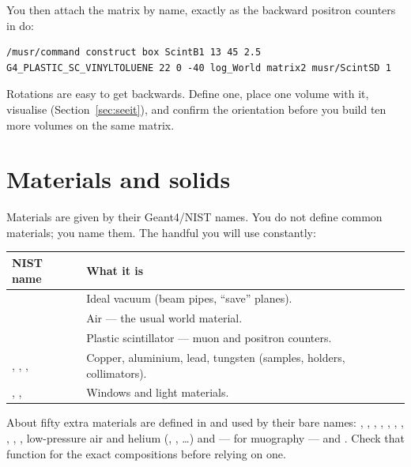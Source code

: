 You then attach the matrix by name, exactly as the backward positron counters in  do:

\begin{lstlisting}[style=mac,caption={Using a named rotation when placing a volume}]
/musr/command construct box ScintB1 13 45 2.5 G4_PLASTIC_SC_VINYLTOLUENE 22 0 -40 log_World matrix2 musr/ScintSD 1
\end{lstlisting}

\begin{tip}
Rotations are easy to get backwards. Define one, place one volume with it, visualise (Section~\ref{sec:seeit}), and confirm the orientation before you build ten more volumes on the same matrix.
\end{tip}

\section{Materials and solids}
\label{sec:solids}
Materials are given by their Geant4/NIST names. You do not define common materials; you name them. The handful you will use constantly:

{\tablestyle
\begin{tabularx}{\textwidth}{@{}>{\raggedright\arraybackslash}p{} L@{}}
\toprule
\textbf{NIST name} & \textbf{What it is}\\
\midrule
{} & Ideal vacuum (beam pipes, ``save'' planes).\\
 & Air --- the usual world material.\\
 & Plastic scintillator --- muon and positron counters.\\
, , ,  & Copper, aluminium, lead, tungsten (samples, holders, collimators).\\
, ,  & Windows and light materials.\\
\bottomrule
\end{tabularx}}

About fifty extra materials are defined in  and used by their bare names: , , , , , , , , , , low-pressure air and helium (, , \dots) and --- for muography ---  and . Check that function for the exact compositions before relying on one.

